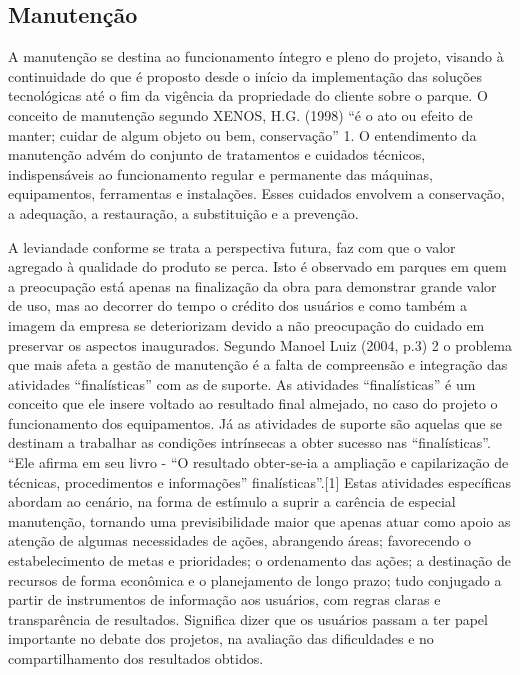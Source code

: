 \subsection{Manutenção}

	A manutenção se destina ao funcionamento íntegro e pleno do projeto, visando à continuidade do que é proposto desde o início da implementação das soluções tecnológicas até o fim da vigência da propriedade do cliente sobre o parque. O conceito de manutenção segundo XENOS, H.G. (1998)  “é o ato ou efeito de manter; cuidar de algum objeto ou bem, conservação” 1. O entendimento da manutenção advém do conjunto de tratamentos e cuidados técnicos, indispensáveis ao funcionamento regular e permanente das máquinas, equipamentos, ferramentas e instalações. Esses cuidados envolvem a conservação, a adequação, a restauração, a substituição e a prevenção.
	
	A leviandade conforme se trata a perspectiva futura, faz com que o valor agregado à qualidade do produto se perca. Isto é observado em parques em quem a preocupação está apenas na finalização da obra para demonstrar grande valor de uso, mas ao decorrer do tempo o crédito dos usuários e como também a imagem da empresa se deteriorizam devido a não preocupação do cuidado em preservar os aspectos inaugurados. Segundo Manoel Luiz (2004, p.3) 2 o problema que mais afeta a gestão de manutenção é a falta de compreensão e integração das atividades “finalísticas” com as de suporte. As atividades “finalísticas” é um conceito que ele insere voltado ao resultado final almejado, no caso do projeto o funcionamento dos equipamentos. Já as atividades de suporte são aquelas que se destinam a trabalhar as condições intrínsecas a obter sucesso nas “finalísticas”. “Ele afirma em seu livro - “O resultado obter-se-ia a ampliação e capilarização de técnicas, procedimentos e informações” finalísticas”.[1] Estas atividades específicas abordam ao cenário, na forma de estímulo a suprir a carência  de especial manutenção, tornando uma previsibilidade maior que apenas atuar como apoio as atenção de algumas necessidades de ações, abrangendo áreas; favorecendo o estabelecimento de metas e prioridades; o ordenamento das ações; a destinação de recursos de forma econômica e o planejamento de longo prazo; tudo conjugado a partir de instrumentos de informação aos usuários, com regras claras e transparência de resultados. Significa dizer que os usuários passam a ter papel importante no debate dos projetos, na avaliação das dificuldades e no compartilhamento dos resultados obtidos.

